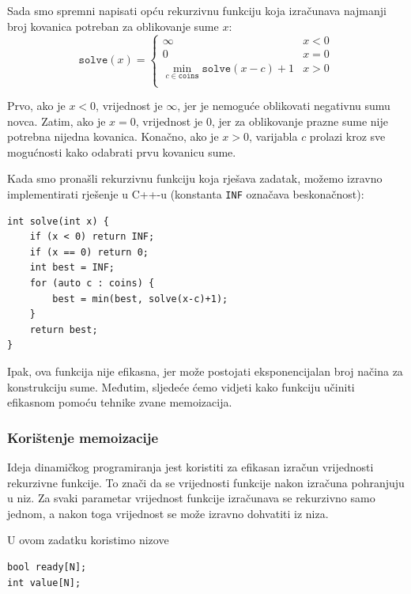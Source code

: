 Sada smo spremni napisati opću rekurzivnu funkciju
koja izračunava najmanji broj
kovanica potreban za oblikovanje sume $x$:
\begin{equation*}
    \texttt{solve}(x) = \begin{cases}
               \infty               & x < 0\\
               0               & x = 0\\
               \min_{c \in \texttt{coins}} \texttt{solve}(x-c)+1 & x > 0 \\
           \end{cases}
\end{equation*}

Prvo, ako je $x<0$, vrijednost je $\infty$,
jer je nemoguće oblikovati negativnu
sumu novca.
Zatim, ako je $x=0$, vrijednost je $0$,
jer za oblikovanje prazne sume nije potrebna nijedna kovanica.
Konačno, ako je $x>0$, varijabla $c$ prolazi kroz
sve mogućnosti kako odabrati prvu kovanicu
sume.

Kada smo pronašli rekurzivnu funkciju koja rješava
zadatak,
možemo izravno implementirati rješenje u C++-u
(konstanta \texttt{INF} označava beskonačnost):

\begin{lstlisting}
int solve(int x) {
    if (x < 0) return INF;
    if (x == 0) return 0;
    int best = INF;
    for (auto c : coins) {
        best = min(best, solve(x-c)+1);
    }
    return best;
}
\end{lstlisting}

Ipak, ova funkcija nije efikasna,
jer može postojati eksponencijalan broj načina
za konstrukciju sume.
Međutim, sljedeće ćemo vidjeti kako funkciju
učiniti efikasnom pomoću tehnike zvane memoizacija.

\subsubsection{Korištenje memoizacije}


Ideja dinamičkog programiranja jest koristiti
 za efikasan izračun
vrijednosti rekurzivne funkcije.
To znači da se vrijednosti funkcije
nakon izračuna pohranjuju u niz.
Za svaki parametar vrijednost funkcije
izračunava se rekurzivno samo jednom, a nakon toga
vrijednost se može izravno dohvatiti iz niza.

U ovom zadatku koristimo nizove
\begin{lstlisting}
bool ready[N];
int value[N];
\end{lstlisting}

